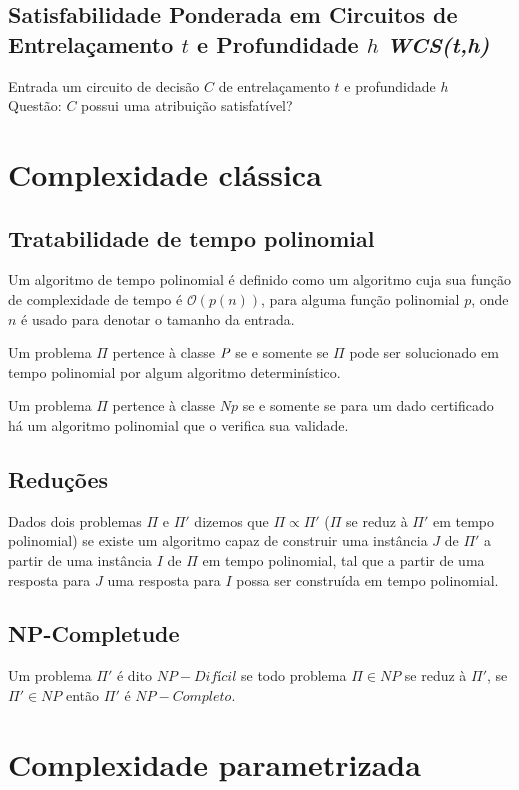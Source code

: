 \subsection{Satisfabilidade Ponderada em Circuitos de Entrelaçamento $t$ e Profundidade $h$ \emph{WCS(t,h)}}
\begin{definition}
 Entrada um circuito de decisão $C$ de entrelaçamento $t$ e profundidade $h$\\
 Questão: $C$ possui uma atribuição satisfatível?
\end{definition}

\section{Complexidade clássica}
\subsection{Tratabilidade de tempo polinomial}
Um algoritmo de tempo polinomial é definido como um algoritmo cuja sua função de complexidade de tempo é $\mathcal{O}(p(n))$, para alguma função polinomial $p$, onde $n$ é usado para denotar o tamanho da entrada.

Um problema $\Pi$ pertence à classe $\P$ se e somente se $\Pi$ pode ser solucionado em tempo polinomial por algum algoritmo determinístico.

Um problema $\Pi$ pertence à classe $\textit{Np}$ se e somente se para um dado certificado há um algoritmo polinomial que o verifica sua validade.

\subsection{Reduções}
Dados dois problemas $\Pi$ e $\Pi'$ dizemos que $\Pi \propto \Pi'$ ($\Pi$ se reduz à $\Pi'$ em tempo polinomial) se existe um algoritmo capaz de construir uma instância $J$ de $\Pi'$ a partir de uma instância $I$ de $\Pi$ em tempo polinomial, tal que a partir de uma resposta para $J$ uma resposta para $I$ possa ser construída em tempo polinomial. 

\subsection{NP-Completude}
Um problema $\Pi'$ é dito $NP-Difícil$ se todo problema $\Pi \in NP$ se reduz à $\Pi'$, se $\Pi' \in NP$ então $\Pi'$ é $NP-Completo$.

\section{Complexidade parametrizada}

